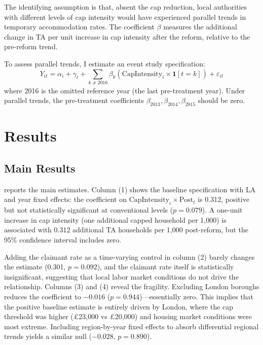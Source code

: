 \documentclass[12pt]{article}
\begin{document}
The identifying assumption is that, absent the cap reduction, local authorities with different levels of cap intensity would have experienced parallel trends in temporary accommodation rates. The coefficient $\beta$ measures the additional change in TA per unit increase in cap intensity after the reform, relative to the pre-reform trend.

To assess parallel trends, I estimate an event study specification:
\begin{equation}
Y_{it} = \alpha_i + \gamma_t + \sum_{k \neq 2016} \beta_k \left( \text{CapIntensity}_i \times \mathbf{1}[t = k] \right) + \varepsilon_{it}
\label{eq:event}
\end{equation}
where 2016 is the omitted reference year (the last pre-treatment year). Under parallel trends, the pre-treatment coefficients $\beta_{2013}, \beta_{2014}, \beta_{2015}$ should be zero.

\section{Results}
\label{sec:results}

\subsection{Main Results}



 reports the main estimates. Column (1) shows the baseline specification with LA and year fixed effects: the coefficient on $\text{CapIntensity}_i \times \text{Post}_t$ is 0.312, positive but not statistically significant at conventional levels ($p = 0.079$). A one-unit increase in cap intensity (one additional capped household per 1,000) is associated with 0.312 additional TA households per 1,000 post-reform, but the 95\% confidence interval includes zero.

Adding the claimant rate as a time-varying control in column (2) barely changes the estimate (0.301, $p = 0.092$), and the claimant rate itself is statistically insignificant, suggesting that local labor market conditions do not drive the relationship. Columns (3) and (4) reveal the fragility. Excluding London boroughs reduces the coefficient to $-0.016$ ($p = 0.944$)---essentially zero. This implies that the positive baseline estimate is entirely driven by London, where the cap threshold was higher (\pounds23,000 vs \pounds20,000) and housing market conditions were most extreme. Including region-by-year fixed effects to absorb differential regional trends yields a similar null ($-0.028$, $p = 0.890$).
\end{document}
